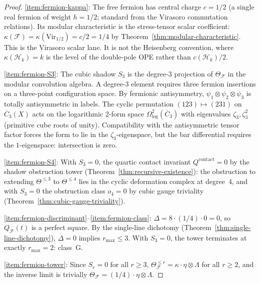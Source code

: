 \begin{proof}
\eqref{item:fermion-kappa}:
The free fermion has central charge $c = 1/2$ (a single real
fermion of weight $h = 1/2$; standard from the Virasoro commutation
relations).
Its modular characteristic is the stress-tensor scalar coefficient:
$\kappa(\mathcal F)=\kappa(\mathrm{Vir}_{1/2})=c/2=1/4$ by
Theorem~\ref{thm:modular-characteristic}. This is the Virasoro scalar
lane. It is not the Heisenberg convention, where
$\kappa(\mathcal H_k)=k$ is the level of the double-pole OPE rather
than $c(\mathcal H_k)/2$.

\eqref{item:fermion-S3}:
The cubic shadow $S_3$ is the degree-$3$ projection of
$\Theta_{\mathcal{F}}$ in the modular convolution algebra. A degree-$3$
element requires three fermion insertions on a three-point configuration
space. By fermionic antisymmetry, $\psi_1 \otimes \psi_2 \otimes \psi_3$
is totally antisymmetric in labels. The cyclic permutation
$(123) \mapsto (231)$ on $\overline{C}_3(X)$ acts on the logarithmic
$2$-form space $\Omega^2_{\log}(\overline{C}_3)$ with eigenvalues
$\zeta_3, \zeta_3^2$ (primitive cube roots of unity). Compatibility
with the antisymmetric tensor factor forces the form to lie in the
$\zeta_3$-eigenspace, but the bar differential requires the
$1$-eigenspace: intersection is zero.

\eqref{item:fermion-S4}:
With $S_3 = 0$, the quartic contact invariant
$Q^{\mathrm{contact}} = 0$ by the shadow obstruction tower
(Theorem~\ref{thm:recursive-existence}):
the obstruction to extending $\Theta^{\leq 3}$ to $\Theta^{\leq 4}$
lies in the cyclic deformation complex at degree~$4$, and with
$S_3 = 0$ the obstruction class $o_4 = 0$
by cubic gauge triviality
(Theorem~\ref{thm:cubic-gauge-triviality}).

\eqref{item:fermion-discriminant}--\eqref{item:fermion-class}:
$\Delta = 8 \cdot (1/4) \cdot 0 = 0$, so $Q_{\mathcal{F}}(t)$ is
a perfect square. By the single-line dichotomy
(Theorem~\ref{thm:single-line-dichotomy}), $\Delta = 0$
implies $r_{\max} \leq 3$. With $S_3 = 0$, the tower terminates
at exactly $r_{\max} = 2$: class~G.

\eqref{item:fermion-tower}:
Since $S_r = 0$ for all $r \geq 3$,
$\Theta_{\mathcal{F}}^{\leq r} = \kappa \cdot \eta \otimes \Lambda$
for all $r \geq 2$, and the inverse limit is trivially
$\Theta_{\mathcal{F}} = (1/4) \cdot \eta \otimes \Lambda$.
\end{proof}

